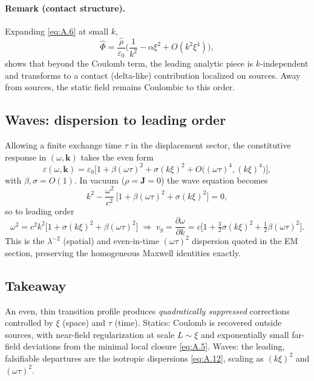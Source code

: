 \paragraph*{Remark (contact structure).} Expanding \eqref{eq:A.6} at small $k$,
\[
\hat\Phi=\frac{\hat\rho}{\varepsilon_0}\Big(\frac{1}{k^2}-\alpha\xi^2+O(k^2\xi^4)\Big),\tag{D.9}
\]
shows that beyond the Coulomb term, the leading analytic piece is $k$-independent and transforms to a contact (delta-like) contribution localized on sources. Away from sources, the static field remains Coulombic to this order.

\subsection{Waves: dispersion to leading order}
Allowing a finite exchange time $\tau$ in the displacement sector, the constitutive response in $(\omega,\mathbf k)$ takes the even form
\[
\varepsilon(\omega,\mathbf k)=\varepsilon_0\Big[1+\beta(\omega\tau)^2+\sigma (k\xi)^2+O\big((\omega\tau)^4,(k\xi)^4\big)\Big],\tag{D.10}
\]
with $\beta,\sigma=O(1)$. In vacuum ($\rho=\mathbf J=0$) the wave equation becomes
\[
k^2-\frac{\omega^2}{c^2}\,\Big[1+\beta(\omega\tau)^2+\sigma (k\xi)^2\Big]=0,\tag{D.11}
\]
so to leading order
\[
\omega^2=c^2 k^2\Big[1+\sigma (k\xi)^2+\beta (\omega\tau)^2\Big]
\;\Rightarrow\;
v_g=\frac{\partial\omega}{\partial k}=c\Big[1+\tfrac{3}{2}\sigma (k\xi)^2+\tfrac{1}{2}\beta (\omega\tau)^2\Big].\tag{D.12}
\]
This is the $\lambda^{-2}$ (spatial) and even-in-time $(\omega\tau)^2$ dispersion quoted in the EM section, preserving the homogeneous Maxwell identities exactly.

\subsection{Takeaway}
An even, thin transition profile produces \emph{quadratically suppressed} corrections controlled by $\xi$ (space) and $\tau$ (time). Statics: Coulomb is recovered outside sources, with near-field regularization at scale $L\sim\xi$ and exponentially small far-field deviations from the minimal local closure \eqref{eq:A.5}. Waves: the leading, falsifiable departures are the isotropic dispersions \eqref{eq:A.12}, scaling as $(k\xi)^2$ and $(\omega\tau)^2$.
